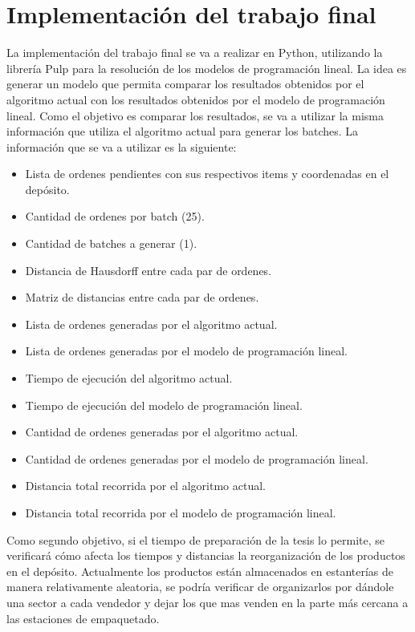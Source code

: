 \documentclass[a4paper,openany]{memoir}
\begin{document}
\section{Implementación del trabajo final}
La implementación del trabajo final se va a realizar en Python, utilizando la librería Pulp para la resolución de los modelos de programación lineal. La idea es generar un modelo que permita comparar los resultados obtenidos por el algoritmo actual con los resultados obtenidos por el modelo de programación lineal. 
Como el objetivo es comparar los resultados, se va a utilizar la misma información que utiliza el algoritmo actual para generar los batches. La información que se va a utilizar es la siguiente:
\begin{itemize}
    \item Lista de ordenes pendientes con sus respectivos items y coordenadas en el depósito.
    \item Cantidad de ordenes por batch (25).
    \item   Cantidad de batches a generar (1).
    \item Distancia de Hausdorff entre cada par de ordenes.
    \item Matriz de distancias entre cada par de ordenes.
    \item Lista de ordenes generadas por el algoritmo actual.
    \item Lista de ordenes generadas por el modelo de programación lineal.
    \item Tiempo de ejecución del algoritmo actual.
    \item Tiempo de ejecución del modelo de programación lineal.
    \item Cantidad de ordenes generadas por el algoritmo actual.
    \item Cantidad de ordenes generadas por el modelo de programación lineal.
    \item Distancia total recorrida por el algoritmo actual.
    \item Distancia total recorrida por el modelo de programación lineal.
\end{itemize}
Como segundo objetivo, si el tiempo de preparación de la tesis lo permite, se verificará cómo afecta los tiempos y distancias la reorganización de los productos en el depósito. Actualmente los productos están almacenados en estanterías de manera relativamente aleatoria, se podría verificar de organizarlos por dándole una sector a cada vendedor y dejar los que mas venden en la parte más cercana  a las estaciones de empaquetado.  
\end{document}
